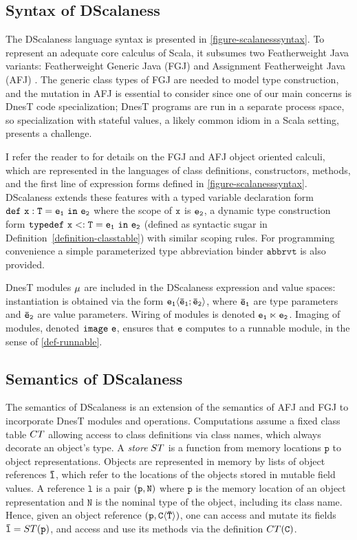 \subsection{Syntax of DScalaness}

\scalanesssyntaxfig

The DScalaness language syntax is presented in \autoref{figure-scalanesssyntax}. To represent an
adequate core calculus of Scala, it subsumes two Featherweight Java variants: Featherweight
Generic Java (FGJ) \cite{FJ} and Assignment Featherweight Java (AFJ) \cite{AFJ}. The generic
class types of FGJ are needed to model type construction, and the mutation in AFJ is essential
to consider since one of our main concerns is DnesT code specialization; DnesT programs are run
in a separate process space, so specialization with stateful values, a likely common idiom in a
Scala setting, presents a challenge.

I refer the reader to \cite{FJ,AFJ} for details on the FGJ and AFJ object oriented calculi,
which are represented in the languages of class definitions, constructors, methods, and the
first line of expression forms defined in \autoref{figure-scalanesssyntax}. DScalaness extends
these features with a typed variable declaration form $\jdef{x}{T}{e_1}{e_2}$ where the scope of
$\tt{x}$ is $\tt{e_2}$, a dynamic type construction form $\jtlet{x}{T}{e_1}{e_2}$ (defined as
syntactic sugar in Definition~\autoref{definition-classtable}) with similar scoping rules. For
programming convenience a simple parameterized type abbreviation binder $\texttt{abbrvt}$ is
also provided.

DnesT modules $\jmodval$ are included in the DScalaness expression and value spaces:
instantiation is obtained via the form $\jinst{e_1}{\ttvec{e}_1; \ttvec{e}_2}$, where
$\ttvec{e}_\texttt{1}$ are type parameters and $\ttvec{e}_\texttt{2}$ are value parameters.
Wiring of modules is denoted $\jwire{\tt{e_1}}{\tt{e_2}}$. Imaging of modules, denoted
$\jimage{\texttt{e}}$, ensures that $\texttt{e}$ computes to a runnable module, in the sense of
\autoref{def-runnable}.

\subsection{Semantics of DScalaness}

The semantics of DScalaness is an extension of the semantics of AFJ and FGJ to incorporate DnesT
modules and operations. Computations assume a fixed class table $\CT$ allowing access to class
definitions via class names, which always decorate an object's type. A \emph{store} $\jstore$ is
a function from memory locations $\texttt{p}$ to object representations. Objects are represented
in memory by lists of object references $\ttvec{l}$, which refer to the locations of the objects
stored in mutable field values. A reference $\texttt{l}$ is a pair $\jref{\texttt{p}}{N}$ where
$\texttt{p}$ is the memory location of an object representation and $\texttt{N}$ is the nominal
type of the object, including its class name. Hence, given an object reference
$\jref{\texttt{p}}{\jinst{C}{\ttvec{T}}}$, one can access and mutate its fields $\ttvec{l} =
\jstore(\texttt{p})$, and access and use its methods via the definition $\CT(\texttt{C})$.

